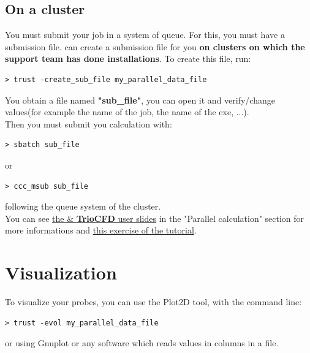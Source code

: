 \subsection{On a cluster}
You must submit your job in a system of queue.
For this, you must have a submission file.
\trust can create a submission file for you \textbf{on clusters on which the support team has done installations}.
To create this file, run:
\begin{verbatim}
> trust -create_sub_file my_parallel_data_file
\end{verbatim}

You obtain a file named \textbf{"sub\_file"}, you can open it and verify/change values(for example the name of the job, the name of the exe, ...).\\

Then you must submit you calculation with:
\begin{verbatim}
> sbatch sub_file
\end{verbatim}
or 
\begin{verbatim}
> ccc_msub sub_file
\end{verbatim}
following the queue system of the cluster.\\


You can see \href{TRUST_and_TrioCFD_presentation.pdf}{the \trust \& \textbf{TrioCFD} user slides} in the "Parallel calculation" section for more informations and \href{TRUST_tutorial.pdf\#exo_para_3}{this exercise of the \trust tutorial}.


\section{Visualization}
To visualize your probes, you can use the Plot2D tool, with the command line:
\begin{verbatim}
> trust -evol my_parallel_data_file
\end{verbatim}
or using Gnuplot or any software which reads values in columns in a file.\\

